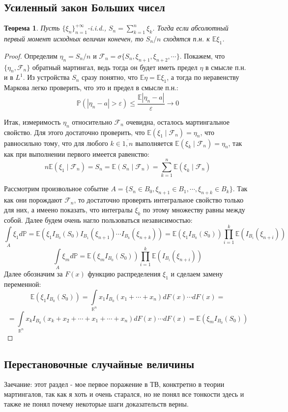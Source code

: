 \documentclass[12pt,a4paper]{article} %
\newtheorem{theorem}{Теорема}
\newcommand{\R}{\mathbb{R}}
\newcommand{\E}{\mathbb{E}}
\newcommand{\PR}{\mathbb{P}}
\newcommand{\F}{\mathcal{F}}
\begin{document}
	\subsection{Усиленный закон Больших чисел}
	\begin{theorem}
		Пусть $\{\xi_n\}_{n=1}^{+\infty}$-i.i.d., $S_n=\displaystyle\sum_{k=1}^n\xi_k$. Тогда если абсолютный первый момент исходных величин конечен, то $S_n/n$ сходятся п.н. к $\E\xi_1$.
	\end{theorem}
	\begin{proof}
		Определим $\eta_n=S_n/n$ и $\F_n=\sigma\{S_n,\xi_{n+1},\xi_{n+2},\cdots\}$. Покажем, что $\{\eta_n,\F_n\}$ обратный мартингал, ведь тогда он будет иметь предел $\eta$ в смысле п.н. и в $L^1$. Из устройства $S_n$ сразу понятно, что $\E\eta=\E\xi_1$, а тогда по неравенству Маркова легко проверить, что это и предел в смысле п.н.:
		$$\PR(|\eta_n-a|>\varepsilon)\leq\frac{\E|\eta_n-a|}{\varepsilon}\rightarrow0$$
		
		Итак, измеримость $\eta_n$ относительно $\F_n$ очевидна, осталось мартингальное свойство. Для этого достаточно проверить, что $\E(\xi_1\mid\F_n)=\eta_n$, что равносильно тому, что для любого $k\in\overline{1,n}$ выполняется $\E(\xi_k\mid\F_n)=\eta_n$, так как при выполнении первого имеется равенство:
		$$n\E(\xi_1\mid\F_n)=S_n=\E(S_n\mid\F_n)=\sum_{k=1}^n\E(\xi_k\mid\F_n)$$
		
		Рассмотрим произвольное событие $A=\{S_n\in B_0,\xi_{n+1}\in B_1,\cdots,\xi_{n+k}\in B_k\}$. Так как они порождают $\F_n$, то достаточно проверять интегральное свойство только для них, а имеено показать, что интегралы $\xi_k$ по этому множеству равны между собой. Далее будем очень нагло пользоваться независимостью:
		$$\int\limits_A\xi_1d\PR=\E(\xi_1I_{B_0}(S_0)I_{B_1}(\xi_{n+1})\cdots I_{B_k}(\xi_{n+k}))=\E(\xi_1I_{B_0}(S_0))\prod_{i=1}^k\E(I_{B_i}(\xi_{n+i}))$$
		$$\int\limits_A\xi_md\PR=\E(\xi_mI_{B_0}(S_0))\prod_{i=1}^k\E(I_{B_i}(\xi_{n+i}))$$
		Далее обозначим за $F(x)$ функцию распределения $\xi_1$ и сделаем замену переменной:
		$$\E(\xi_1I_{B_0}(S_0))=\int\limits_{\R^n}x_1I_{B_0}(x_1+\cdots+x_n)dF(x)\cdots dF(x)=$$
		$$=\int\limits_{\R^n}x_kI_{B_0}(x_k+x_2+\cdots+x_1+\cdots+x_n)dF(x)\cdots dF(x)=\E(\xi_mI_{B_0}(S_0))$$
	\end{proof}
	\subsection{Перестановочные случайные величины}
	Заечание: этот раздел - мое первое поражение в ТВ, конктретно в теории мартингалов, так как я хоть и очень старался, но не понял все тонкости здесь и также не понял почему некоторые шаги доказательств верны.
	
\end{document}
